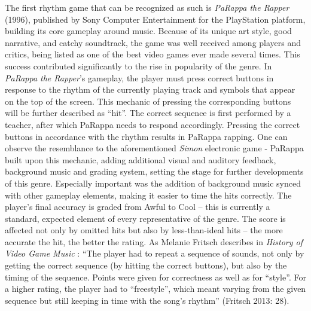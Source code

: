 The first rhythm game that can be recognized as such is \textit{PaRappa the Rapper} (1996), published by Sony Computer Entertainment for the PlayStation platform, building its core gameplay around music. Because of its unique art style, good narrative, and catchy soundtrack, the game was well received among players and critics, being listed as one of the best video games ever made several times. \cite{acclaimed_videogames_parappa} This success contributed significantly to the rise in popularity of the genre. In \textit{PaRappa the Rapper}’s gameplay, the player must press correct buttons in response to the rhythm of the currently playing track and symbols that appear on the top of the screen. This mechanic of pressing the corresponding buttons will be further described as “hit”. The correct sequence is first performed by a teacher, after which PaRappa needs to respond accordingly. Pressing the correct buttons in accordance with the rhythm results in PaRappa rapping. One can observe the resemblance to the aforementioned \textit{Simon} electronic game - PaRappa built upon this mechanic, adding additional visual and auditory feedback, background music and grading system, setting the stage for further developments of this genre. Especially important was the addition of background music synced with other gameplay elements, making it easier to time the hits correctly. The player’s final accuracy is graded from Awful to Cool -- this is currently a standard, expected element of every representative of the genre. The score is affected not only by omitted hits but also by less-than-ideal hits -- the more accurate the hit, the better the rating. As Melanie Fritsch describes in \textit{History of Video Game Music} \cite{MusicMedien}: “The player had to repeat a sequence of sounds, not only by getting the correct sequence (by hitting the correct buttons), but also by the timing of the sequence. Points were given for correctness as well as for “style”. For a higher rating, the player had to “freestyle”, which meant varying from the given sequence but still keeping in time with the song’s rhythm” (Fritsch 2013: 28).

